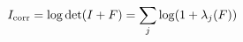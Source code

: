 \documentclass[border=3pt]{standalone}
\begin{document}
\color{ink}\fontsize{23}{28}\selectfont
$\displaystyle I_{\rm corr}=\log\det(I+F)=\sum_j\log(1+\lambda_j(F))$
\end{document}

